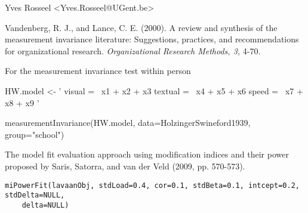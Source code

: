 \documentclass[a4paper]{book}
\begin{document}
%
\begin{Author}\relax
Yves Rosseel <Yves.Rosseel@UGent.be>
\end{Author}
%
\begin{References}\relax
Vandenberg, R. J., and Lance, C. E. (2000). A review and synthesis of the measurement invariance literature: Suggestions, practices, and recommendations for organizational research. \emph{Organizational Research Methods, 3,} 4-70.
\end{References}
%
\begin{SeeAlso}\relax
{} For the measurement invariance test within person
\end{SeeAlso}
%
\begin{Examples}
\begin{ExampleCode}
HW.model <- ' visual =~ x1 + x2 + x3
              textual =~ x4 + x5 + x6
              speed =~ x7 + x8 + x9 '

measurementInvariance(HW.model, data=HolzingerSwineford1939, group="school")
\end{ExampleCode}
\end{Examples}
%
\begin{Description}\relax
The model fit evaluation approach using modification indices and their power proposed by Saris, Satorra, and van der Veld (2009, pp. 570-573).
\end{Description}
%
\begin{Usage}
\begin{verbatim}
miPowerFit(lavaanObj, stdLoad=0.4, cor=0.1, stdBeta=0.1, intcept=0.2, stdDelta=NULL, 
	delta=NULL)
\end{verbatim}
\end{Usage}
%
\end{document}
